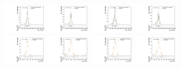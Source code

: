 \begin{figure}[htpb]
  \includegraphics[width=0.2\textwidth]{fig/2Dfit/templateVsReco_RadToWW2000_r0_MVV_mu_HP_vbf_LDy_linear.pdf}
  \includegraphics[width=0.2\textwidth]{fig/2Dfit/templateVsReco_RadToWW2000_r0_MVV_mu_LP_vbf_LDy_linear.pdf}
  \includegraphics[width=0.2\textwidth]{fig/2Dfit/templateVsReco_RadToWW2000_r0_MVV_mu_HP_vbf_HDy_linear.pdf}
  \includegraphics[width=0.2\textwidth]{fig/2Dfit/templateVsReco_RadToWW2000_r0_MVV_mu_LP_vbf_HDy_linear.pdf}\\
  \includegraphics[width=0.2\textwidth]{fig/2Dfit/templateVsReco_RadToWW2000_r0_MJ_mu_HP_bb_LDy.pdf}
  \includegraphics[width=0.2\textwidth]{fig/2Dfit/templateVsReco_RadToWW2000_r0_MJ_mu_LP_bb_LDy.pdf}
  \includegraphics[width=0.2\textwidth]{fig/2Dfit/templateVsReco_RadToWW2000_r0_MJ_mu_HP_bb_HDy.pdf}
  \includegraphics[width=0.2\textwidth]{fig/2Dfit/templateVsReco_RadToWW2000_r0_MJ_mu_LP_bb_HDy.pdf}\\

\end{figure}
